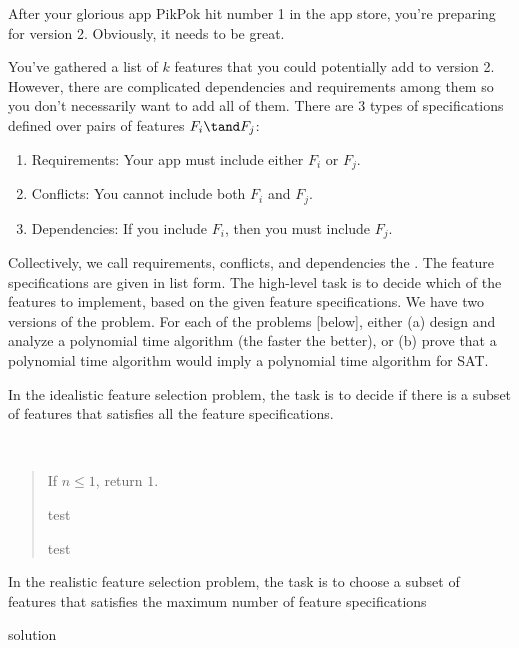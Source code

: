 \documentclass{article}
\begin{document}
 After your glorious app PikPok hit number 1 in the app store, you're
preparing for version 2.
Obviously, it needs to be great.

You've gathered a list of $k$ features  that you could potentially add to version 2.
However, there are complicated dependencies and requirements among them so you don't necessarily want to add all of them.
There are 3 types of specifications defined over pairs of features $F_i \tand F_j$: \begin{enumerate}
  \item Requirements: Your app must include either $F_i$ or $F_j$.
  \item Conflicts: You cannot include both $F_i$ and $F_j$.
  \item Dependencies: If you include $F_i$, then you must include $F_j$.
\end{enumerate}
Collectively, we call requirements, conflicts, and dependencies the .
The feature specifications are given in list form.
The high-level task is to decide which of the features to implement, based on the given feature specifications.
We have two versions of the problem. For each of the problems [below], either (a) design and analyze a polynomial time algorithm (the faster the better), or (b) prove that a polynomial time algorithm would imply a polynomial time algorithm for SAT.
\setcounter{section}{10}
\setcounter{exercise}{3}
\begin{subexercise}
In the idealistic feature selection problem, the task is to decide if there is a subset of features that satisfies all the feature specifications.
\end{subexercise}

\begin{solution}\ %
\begin{quote}%
\noindent{}%


\begin{steps}
  \item If $ n \leq 1 $, return $ 1 $.
  \item test \begin{steps}
      \item test
  \end{steps}
\end{steps}
\end{quote}
\end{solution}
\pagebreak

\begin{subexercise}
In the realistic feature selection problem, the task is to choose a subset of features that satisfies the maximum number of feature specifications
\end{subexercise}

\begin{solution}
solution
\end{solution}
\end{document}
